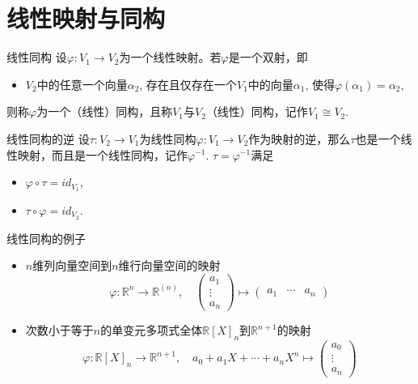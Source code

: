 
\section{线性映射与同构}


\begin{frame}

\begin{block}{线性同构}
设$\varphi: V_1 \to V_2$为一个线性映射。若$\varphi$是一个双射，即
\begin{itemize}
\item $V_2$中的任意一个向量$\alpha_2$, 存在且仅存在一个$V_1$中的向量$\alpha_1$, 使得$\varphi(\alpha_1) = \alpha_2$,
\end{itemize}
则称$\varphi$为一个（线性）同构，且称$V_1$与$V_2$（线性）同构，记作$V_1 \cong V_2$.
\end{block}

\vspace{1em}
\pause

\begin{block}{线性同构的逆}
设$\tau: V_2 \to V_1$为线性同构$\varphi: V_1 \to V_2$作为映射的逆，那么$\tau$也是一个线性映射，而且是一个线性同构，记作$\varphi^{-1}$. $\tau = \varphi^{-1}$满足
\begin{itemize}
\item $\varphi\circ\tau = id_{V_1}$,
\item $\tau\circ\varphi = id_{V_2}$.
\end{itemize}
\end{block}

\end{frame}


\begin{frame}

\begin{block}{线性同构的例子}
\begin{itemize}
\item $n$维列向量空间到$n$维行向量空间的映射
\[\varphi: \mathbb{R}^n \to \mathbb{R}^{(n)}, \quad \begin{pmatrix} a_1 \\ \vdots \\ a_n \end{pmatrix} \mapsto \begin{pmatrix} a_1 & \cdots & a_n \end{pmatrix}\]
\item 次数小于等于$n$的单变元多项式全体$\mathbb{R}[X]_n$到$\mathbb{R}^{n+1}$的映射
\[\varphi: \mathbb{R}[X]_n \to \mathbb{R}^{n+1}, \quad a_0 + a_1X + \cdots + a_nX^n \mapsto \begin{pmatrix} a_0 \\ \vdots \\ a_n \end{pmatrix}\]
\end{itemize}
\end{block}

\end{frame}

